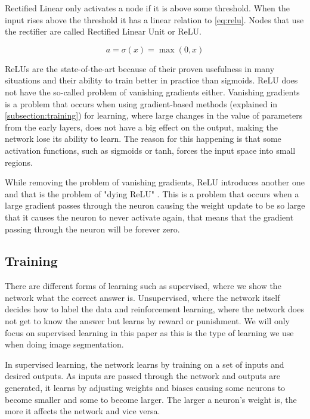 Rectified Linear only activates a node if it is above some threshold. When the input rises above the threshold it has a linear relation to \autoref{eq:relu}. Nodes that use the rectifier are called Rectified Linear Unit or ReLU. 

\begin{equation}
\label{eq:relu}
a = \sigma(x) = \max(0, x)
\end{equation}


ReLUs are the state-of-the-art because of their proven usefulness in many situations and their ability to train better in practice than sigmoids. ReLU does not have the so-called problem of vanishing gradients either. Vanishing gradients is a problem that occurs when using gradient-based methods (explained in \autoref{subsection:training}) for learning, where large changes in the value of parameters from the early layers, does not have a big effect on the output, making the network lose its ability to learn. The reason for this happening is that some activation functions, such as sigmoids or tanh, forces the input space into small regions. 

While removing the problem of vanishing gradients, ReLU introduces another one and that is the problem of "dying ReLU" \cite{Li}. This is a problem that occurs when a large gradient passes through the neuron causing the weight update to be so large that it causes the neuron to never activate again, that means that the gradient passing through the neuron will be forever zero.


\subsection{Training}\label{subsection:training}
There are different forms of learning such as supervised, where we show the network what the correct answer is. Unsupervised, where the network itself decides how to label the data and reinforcement learning, where the network does not get to know the answer but learns by reward or punishment. We will only focus on supervised learning in this paper as this is the type of learning we use when doing image segmentation.

In supervised learning, the network learns by training on a set of inputs and desired outputs. As inputs are passed through the network and outputs are generated, it learns by adjusting weights and biases causing some neurons to become smaller and some to become larger. The larger a neuron's weight is, the more it affects the network and vice versa.

